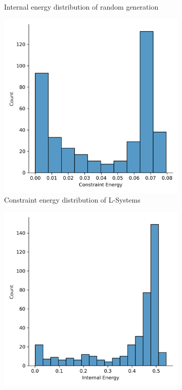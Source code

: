 \begin{figure}[H]
\begin{subfigure}[c]{0.45\textwidth}
		\caption{Internal energy distribution of random generation}
	\end{subfigure}
	\hfill
	\begin{subfigure}[c]{0.45\textwidth}
		\centering
		\includegraphics[width=\textwidth]{ce_ls.png}
		\caption{Constraint energy distribution of L-Systems}
	\end{subfigure}
	\hfill
	\begin{subfigure}[c]{0.45\textwidth}
		\centering
		\includegraphics[width=\textwidth]{ie_ls.png}

\end{subfigure}
\end{figure}
